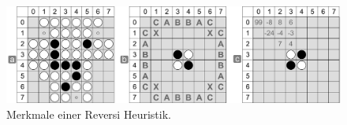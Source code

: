 \begin{figure}[!htbp]
  \centering
  \includegraphics[scale = 0.5]{inhalt/abbildungen/reversi_movement_notation_positioning.pdf}
  \caption{Merkmale einer Reversi Heuristik.}
  \label{fig:reversi_movement_notation_positioning}
\end{figure}

